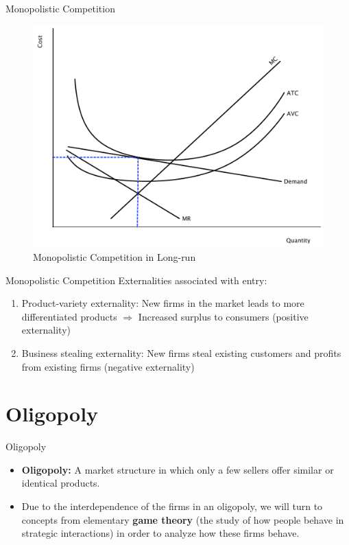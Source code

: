 \documentclass[xcolor={dvipsnames},pdf, hyperref={colorlinks=true, citecolor=ForestGreen, linkcolor=BlueViolet, urlcolor=Magenta}, handout]{beamer}
\theoremstyle{definition}
\newcommand{\defn}[1]{\textbf{#1}}
\begin{document}
\begin{frame}{Monopolistic Competition}
	
\begin{figure}
	\centering
	\includegraphics[scale=.40]{plot81.pdf}
	\caption{Monopolistic Competition in Long-run}
\end{figure}
\end{frame}



\begin{frame}{Monopolistic Competition}
Externalities associated with entry:
\begin{enumerate}
	\item Product-variety externality: New firms in the market leads to more differentiated products $\Rightarrow$ Increased surplus to consumers (positive externality)
	\item Business stealing externality: New firms steal existing customers and profits from existing firms (negative externality)
\end{enumerate}

\end{frame}

\section{Oligopoly}


\begin{frame}{Oligopoly}
\begin{itemize}
	\item 	
	\defn{Oligopoly:} A market structure in which only a few sellers offer similar or identical products.
	\item Due to the interdependence of the firms in an oligopoly, we will turn to concepts from elementary \textbf{game theory} (the study of how people behave in strategic interactions) in order to analyze how these firms behave. 
	
	
\end{itemize}
\end{frame}
\end{document}
